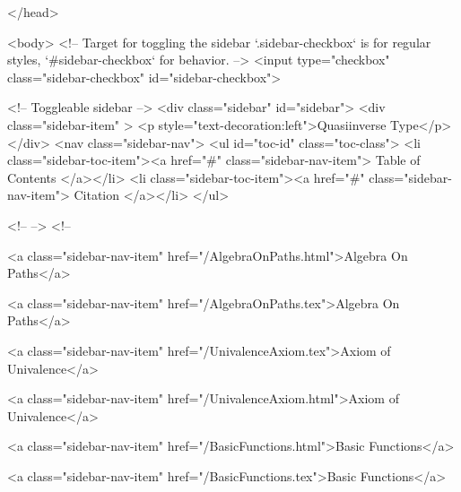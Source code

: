   
</head>




  <body>
    <!-- Target for toggling the sidebar `.sidebar-checkbox` is for regular
     styles, `#sidebar-checkbox` for behavior. -->
<input type="checkbox" class="sidebar-checkbox" id="sidebar-checkbox">

<!-- Toggleable sidebar -->
<div class="sidebar" id="sidebar">
  <div class="sidebar-item" >
    <p style="text-decoration:left">Quasiinverse Type</p>
  </div>
  <nav class="sidebar-nav">
    <ul id="toc-id" class="toc-class">
  <li class="sidebar-toc-item"><a href="#" class="sidebar-nav-item"> Table of Contents </a></li>
  <li class="sidebar-toc-item"><a href="#" class="sidebar-nav-item"> Citation </a></li>
</ul>


    <!--  -->
    <!-- 
      
    
      
    
      
    
      
        
      
    
      
        
          <a class="sidebar-nav-item" href="/AlgebraOnPaths.html">Algebra On Paths</a>
        
      
    
      
        
          <a class="sidebar-nav-item" href="/AlgebraOnPaths.tex">Algebra On Paths</a>
        
      
    
      
        
          <a class="sidebar-nav-item" href="/UnivalenceAxiom.tex">Axiom of Univalence</a>
        
      
    
      
        
          <a class="sidebar-nav-item" href="/UnivalenceAxiom.html">Axiom of Univalence</a>
        
      
    
      
        
          <a class="sidebar-nav-item" href="/BasicFunctions.html">Basic Functions</a>
        
      
    
      
        
          <a class="sidebar-nav-item" href="/BasicFunctions.tex">Basic Functions</a>
        
      
    
      
        
